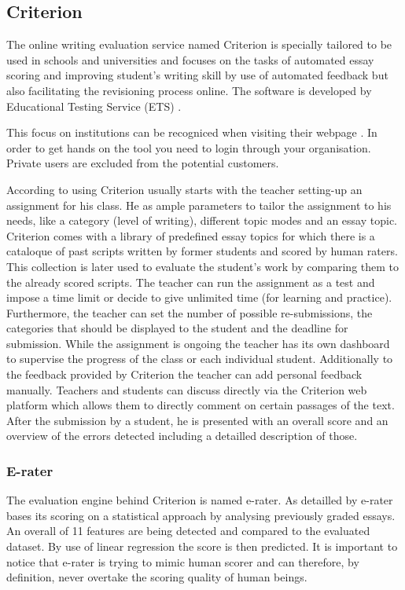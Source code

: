 \documentclass[runningheads]{llncs}
\let\OldTextregistered\textregistered
\renewcommand{\textregistered}{\OldTextregistered\xspace}
\begin{document}
\subsection{Criterion\textregistered}
The online writing evaluation service named Criterion\textregistered is specially tailored to be used in schools and universities and focuses on the tasks of automated essay scoring and improving student's writing skill by use of automated feedback but also facilitating the revisioning process online. The software is developed by Educational Testing Service (ETS) \citep{noauthor_ets_nodate}.

This focus on institutions can be recogniced when visiting their webpage \citep{noauthor_ets_nodate}. In order to get hands on the tool you need to login through your organisation. Private users are excluded from the potential customers. 

According to \textcite{lim_review_2012} using Criterion\textregistered usually starts with the teacher setting-up an assignment for his class. He as ample parameters to tailor the assignment to his needs, like a category (level of writing), different topic modes and an essay topic. Criterion\textregistered comes with a library of predefined essay topics for which there is a cataloque of past scripts written by former students and scored by human raters. This collection is later used to evaluate the student's work by comparing them to the already scored scripts. The teacher can run the assignment as a test and impose a time limit or decide to give unlimited time (for learning and practice). Furthermore, the teacher can set the number of possible re-submissions, the categories that should be displayed to the student and the deadline for submission. While the assignment is ongoing the teacher has its own dashboard to supervise the progress of the class or each individual student. Additionally to the feedback provided by Criterion\textregistered the teacher can add personal feedback manually. Teachers and students can discuss directly via the Criterion\textregistered web platform which allows them to directly comment on certain passages of the text. After the submission by a student, he is presented with an overall score and an overview of the errors detected including a detailled description of those.

\subsubsection{E-rater}
The evaluation engine behind Criterion\textregistered is named e-rater\textregistered. As detailled by \textcite{lim_review_2012} e-rater\textregistered bases its scoring on a statistical approach by analysing previously graded essays. An overall of 11 features are being detected and compared to the evaluated dataset. By use of linear regression the score is then predicted. It is important to notice that e-rater\textregistered is trying to mimic human scorer and can therefore, by definition, never overtake the scoring quality of human beings. 
\end{document}

